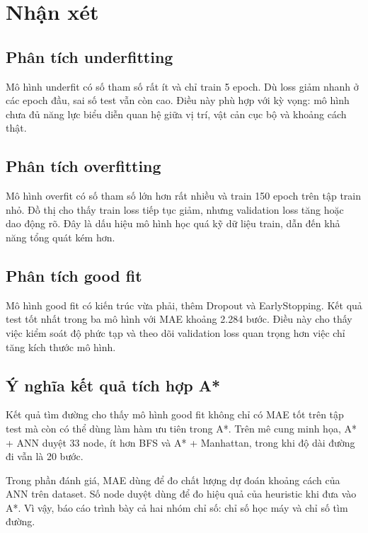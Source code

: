 \documentclass[12pt,a4paper]{article}
\begin{document}
\section{Nhận xét}

\subsection{Phân tích underfitting}

Mô hình underfit có số tham số rất ít và chỉ train 5 epoch. Dù loss giảm nhanh ở các epoch đầu, sai số test vẫn còn cao. Điều này phù hợp với kỳ vọng: mô hình chưa đủ năng lực biểu diễn quan hệ giữa vị trí, vật cản cục bộ và khoảng cách thật.

\subsection{Phân tích overfitting}

Mô hình overfit có số tham số lớn hơn rất nhiều và train 150 epoch trên tập train nhỏ. Đồ thị cho thấy train loss tiếp tục giảm, nhưng validation loss tăng hoặc dao động rõ. Đây là dấu hiệu mô hình học quá kỹ dữ liệu train, dẫn đến khả năng tổng quát kém hơn.

\subsection{Phân tích good fit}

Mô hình good fit có kiến trúc vừa phải, thêm Dropout và \mbox{EarlyStopping}. Kết quả test tốt nhất trong ba mô hình với MAE khoảng 2.284 bước. Điều này cho thấy việc kiểm soát độ phức tạp và theo dõi validation loss quan trọng hơn việc chỉ tăng kích thước mô hình.

\subsection{Ý nghĩa kết quả tích hợp A*}

Kết quả tìm đường cho thấy mô hình good fit không chỉ có MAE tốt trên tập test mà còn có thể dùng làm hàm ưu tiên trong A*. Trên mê cung minh họa, A* + ANN duyệt 33 node, ít hơn BFS và A* + Manhattan, trong khi độ dài đường đi vẫn là 20 bước.

Trong phần đánh giá, MAE dùng để đo chất lượng dự đoán khoảng cách của ANN trên dataset. Số node duyệt dùng để đo hiệu quả của heuristic khi đưa vào A*. Vì vậy, báo cáo trình bày cả hai nhóm chỉ số: chỉ số học máy và chỉ số tìm đường.
\end{document}
